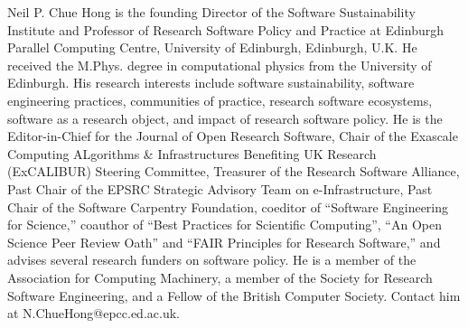 \documentclass{ieeeaccess}
\begin{document}
\begin{IEEEbiography}
{Neil P. Chue Hong} is the founding Director of the Software Sustainability Institute and Professor of Research Software Policy and Practice at Edinburgh Parallel Computing Centre, University of Edinburgh, Edinburgh, U.K. He received the M.Phys. degree in computational physics from the University of Edinburgh. His research interests include software sustainability, software engineering practices, communities of practice, research software ecosystems, software as a research object, and impact of research software policy. He is the Editor-in-Chief for the Journal of Open Research Software, Chair of the Exascale Computing ALgorithms \& Infrastructures Benefiting UK Research (ExCALIBUR) Steering Committee, Treasurer of the Research Software Alliance, Past Chair of the EPSRC Strategic Advisory Team on e-Infrastructure, Past Chair of the Software Carpentry Foundation, coeditor of “Software Engineering for Science,” coauthor of “Best Practices for Scientific Computing”, “An Open Science Peer Review Oath” and “FAIR Principles for Research Software,” and advises several research funders on software policy. He is a member of the Association for Computing Machinery, a member of the Society for Research Software Engineering, and a Fellow of the British Computer Society. Contact him at N.ChueHong@epcc.ed.ac.uk.
\end{IEEEbiography}
\end{document}
